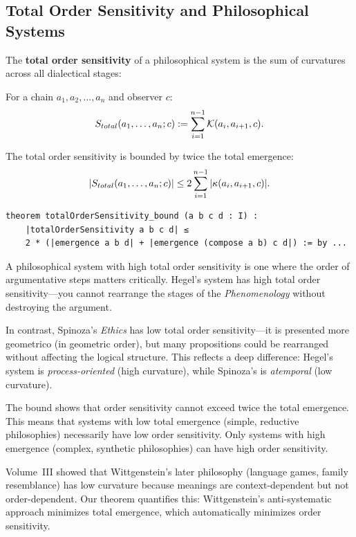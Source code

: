 \subsection{Total Order Sensitivity and Philosophical Systems}

The \textbf{total order sensitivity} of a philosophical system is the sum of
curvatures across all dialectical stages:

\begin{definition}
\label{def:total-order-sensitivity}
For a chain $a_1, a_2, \ldots, a_n$ and observer $c$:
\[
  S_{total}(a_1, \ldots, a_n; c) := \sum_{i=1}^{n-1} \mathcal{K}(a_i, a_{i+1}, c).
\]
\end{definition}

\begin{theorem}
\label{thm:total-order-sensitivity-bound}
The total order sensitivity is bounded by twice the total emergence:
\[
  |S_{total}(a_1, \ldots, a_n; c)| \leq 2 \sum_{i=1}^{n-1} |\kappa(a_i, a_{i+1}, c)|.
\]
\end{theorem}

\begin{lstlisting}[caption={Total order sensitivity (IDT\_v3\_Emergence.lean)}]
theorem totalOrderSensitivity_bound (a b c d : I) :
    |totalOrderSensitivity a b c d| ≤
    2 * (|emergence a b d| + |emergence (compose a b) c d|) := by ...
\end{lstlisting}

\begin{interpretation}
A philosophical system with high total order sensitivity is one where the order
of argumentative steps matters critically. Hegel's system has high total order
sensitivity---you cannot rearrange the stages of the \emph{Phenomenology}
without destroying the argument.

In contrast, Spinoza's \emph{Ethics} has low total order sensitivity---it is
presented more geometrico (in geometric order), but many propositions could
be rearranged without affecting the logical structure. This reflects a deep
difference: Hegel's system is \emph{process-oriented} (high curvature), while
Spinoza's is \emph{atemporal} (low curvature).

The bound shows that order sensitivity cannot exceed twice the total emergence.
This means that systems with low total emergence (simple, reductive philosophies)
necessarily have low order sensitivity. Only systems with high emergence
(complex, synthetic philosophies) can have high order sensitivity.

Volume~III showed that Wittgenstein's later philosophy (language games, family
resemblance) has low curvature because meanings are context-dependent but not
order-dependent. Our theorem quantifies this: Wittgenstein's anti-systematic
approach minimizes total emergence, which automatically minimizes order
sensitivity.
\end{interpretation}


